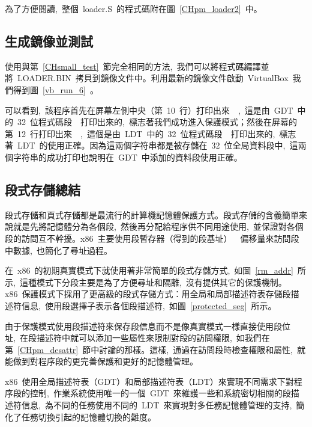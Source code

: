 為了方便閱讀,~整個~loader.S~的程式碼附在圖~\ref{CHpm_loader2}~中。

\label{CHpm_loader2}

\subsection{生成鏡像並測試}

使用與第~\ref{CHsmall_test}~節完全相同的方法,~我們可以將程式碼編譯並將~LOADER.BIN~拷貝到鏡像文件中。利用最新的鏡像文件啟動~VirtualBox~我們得到圖~\ref{vb_run_6}~。


可以看到,~該程序首先在屏幕左側中央（第~10~行）打印出來~~,~這是由~GDT~中的~32~位程式碼段~~打印出來的,~標志著我們成功進入保護模式；然後在屏幕的第~12~行打印出來~~,~這個是由~LDT~中的~32~位程式碼段~~打印出來的,~標志著~LDT~的使用正確。因為這兩個字符串都是被存儲在~32~位全局資料段中,~這兩個字符串的成功打印也說明在~GDT~中添加的資料段使用正確。

\subsection{段式存儲總結}

段式存儲和頁式存儲都是最流行的計算機記憶體保護方式。段式存儲的含義簡單來說就是先將記憶體分為各個段,~然後再分配給程序供不同用途使用,~並保證對各個段的訪問互不幹擾。x86~主要使用段暫存器（得到的段基址）~\code{+}~偏移量來訪問段中數據,~也簡化了尋址過程。

在~x86~的初期真實模式下就使用著非常簡單的段式存儲方式,~如圖~\ref{rm_addr}~所示,~這種模式下分段主要是為了方便尋址和隔離,~沒有提供其它的保護機制。x86~保護模式下採用了更高級的段式存儲方式：用全局和局部描述符表存儲段描述符信息,~使用段選擇子表示各個段描述符,~如圖~\ref{protected_seg}~所示。

由于保護模式使用段描述符來保存段信息而不是像真實模式一樣直接使用段位址,~在段描述符中就可以添加一些屬性來限制對段的訪問權限,~如我們在第~\ref{CHpm_desattr}~節中討論的那樣。這樣,~通過在訪問段時檢查權限和屬性,~就能做到對程序段的更完善保護和更好的記憶體管理。

x86~使用全局描述符表（GDT）和局部描述符表（LDT）來實現不同需求下對程序段的控制,~作業系統使用唯一的一個~GDT~來維護一些和系統密切相關的段描述符信息,~為不同的任務使用不同的~LDT~來實現對多任務記憶體管理的支持,~簡化了任務切換引起的記憶體切換的難度。

